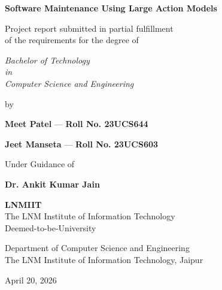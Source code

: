 \documentclass[12pt,a4paper]{report}
\begin{document}
\begin{titlepage}
    \centering
    \vspace*{1.0cm}
    
    {\LARGE \textbf{Software Maintenance Using Large Action Models}\par}
    
    \vspace{2.5cm}
    
    {\large Project report submitted in partial fulfillment\\
    of the requirements for the degree of\par}
    
    \vspace{0.8cm}
    
    {\Large \textit{Bachelor of Technology\\in\\Computer Science and Engineering}\par}
    
    \vspace{1.5cm}
    
    {\large by\par}
    
    \vspace{0.5cm}
    
    {\large \textbf{Meet Patel} \quad --- \quad \textbf{Roll No. 23UCS644}\par}
    {\large \textbf{Jeet Manseta} \quad --- \quad \textbf{Roll No. 23UCS603}\par}
    
    \vspace{1.5cm}
    
    {\large Under Guidance of\par}
    {\large \textbf{Dr. Ankit Kumar Jain}\par}
    
    \vspace{2.0cm}
    
    \begin{center}
        \textbf{\Huge LNMIIT}\\[0.2cm]
        {\small The LNM Institute of Information Technology}\\[0.1cm]
        {\footnotesize Deemed-to-be-University}
    \end{center}
    
    \vspace{1.0cm}
    
    {\large Department of Computer Science and Engineering\\
    The LNM Institute of Information Technology, Jaipur\par}
    
    \vspace{0.8cm}
    
    {\large April 20, 2026\par}
\end{titlepage}
\end{document}
